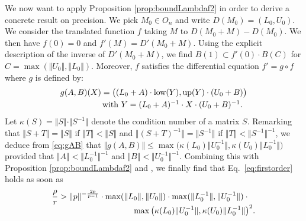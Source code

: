 \documentclass{sig-alternate}
\newcommand{\low}{\text{\rm low}}
\newcommand{\up}{\text{\rm up}}
\begin{document}
We now want to apply Proposition \ref{prop:boundLambdaf2}
in order to derive a concrete result on precision. We pick $M_0 \in
O_n$ and write $D(M_0) = (L_0,U_0)$. We consider the translated
function $f$ taking $M$ to $D(M_0+M)-D(M_0)$. We then have $f(0) = 0$ 
and $f'(M) = D'(M_0+M)$. Using the explicit description of the inverse
of $D'(M_0+M)$, we find $B(1) \subset f'(0) \cdot B(C)$
for $C = \max(\Vert U_0 \Vert, \Vert L_0 \Vert)$. Moreover, $f$ satisfies 
the differential equation $f' = g \circ f$ where $g$ is defined by:
\begin{equation}
\label{eq:gAB}
\begin{array}{l}
g(A,B)(X) = \big( (L_0+A) \cdot \low(Y), \up(Y) \cdot (U_0+B) \big)
\smallskip \\
\hspace{1.8cm}\text{with } Y = (L_0+A)^{-1} \cdot X \cdot (U_0+B)^{-1}.
\end{array}
\end{equation}
Let $\kappa(S) = \Vert S \Vert \cdot \Vert S^{-1} \Vert$ denote the 
condition number of a matrix $S$. Remarking that $\Vert S + T 
\Vert = \Vert S \Vert$ if $\Vert T \Vert < \Vert S \Vert$ and $\Vert (S 
+ T)^{-1} \Vert = \Vert S^{-1} \Vert$ if $\Vert T \Vert < \Vert S^{-1} 
\Vert^{-1}$, we deduce from \eqref{eq:gAB} that
$\Vert g(A,B) \Vert \leq \max 
\big( \kappa(L_0) \Vert U_0^{-1} \Vert, 
\kappa(U_0) \Vert L_0^{-1} \Vert \big)$
provided that $\Vert A \Vert < \Vert L_0^{-1} \Vert^{-1}$ and 
$\Vert B \Vert < \Vert U_0^{-1} \Vert^{-1}$.
Combining this with Proposition \ref{prop:boundLambdaf2} and 
\cite[Proposition.~3.12]{caruso-roe-vaccon:14a}, we finally find that 
Eq.~\eqref{eq:firstorder} holds as soon as 
$$\begin{array}{l}
\displaystyle \frac \rho r > \Vert p \Vert^{-\frac{2p}{p-1}} \cdot
\max ( \Vert L_0 \Vert, \Vert U_0 \Vert) \cdot
\max ( \Vert L_0 ^{-1} \Vert, \Vert U_0 ^{-1} \Vert) \cdot{} \\
\hspace{3.5cm} \max \big( \kappa(L_0) \Vert U_0^{-1} \Vert, 
  \kappa(U_0) \Vert L_0^{-1} \Vert \big)^2.
\end{array}$$
\end{document}
